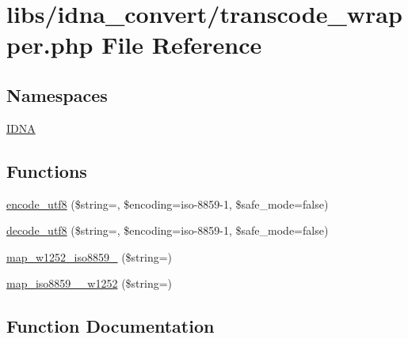\hypertarget{transcode__wrapper_8php}{}\section{libs/idna\+\_\+convert/transcode\+\_\+wrapper.php File Reference}
\label{transcode__wrapper_8php}
\subsection*{Namespaces}
\begin{DoxyCompactItemize}
\item 
 \hyperlink{namespaceIDNA}{I\+D\+NA}
\end{DoxyCompactItemize}
\subsection*{Functions}
\begin{DoxyCompactItemize}
\item 
\hyperlink{transcode__wrapper_8php_a147306b164c54c2137611b5e34e68695}{encode\+\_\+utf8} (\$string=\textquotesingle{}\textquotesingle{}, \$encoding=\textquotesingle{}iso-\/8859-\/1\textquotesingle{}, \$safe\+\_\+mode=false)
\item 
\hyperlink{transcode__wrapper_8php_aec7fb3aa5901e2464b528cfcfef90286}{decode\+\_\+utf8} (\$string=\textquotesingle{}\textquotesingle{}, \$encoding=\textquotesingle{}iso-\/8859-\/1\textquotesingle{}, \$safe\+\_\+mode=false)
\item 
\hyperlink{transcode__wrapper_8php_ab498abf492a3888848b6b0166994d801}{map\+\_\+w1252\+\_\+iso8859\+\_} (\$string=\textquotesingle{}\textquotesingle{})
\item 
\hyperlink{transcode__wrapper_8php_a0602d74ebe1154bc91bfce79d7274a65}{map\+\_\+iso8859\+\_\+\_\+w1252} (\$string=\textquotesingle{}\textquotesingle{})
\end{DoxyCompactItemize}


\subsection{Function Documentation}
\hypertarget{transcode__wrapper_8php_aec7fb3aa5901e2464b528cfcfef90286}{}\label{transcode__wrapper_8php_aec7fb3aa5901e2464b528cfcfef90286} 
